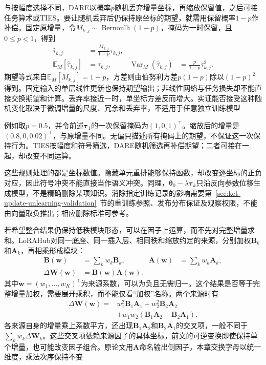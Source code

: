 与按幅度选择不同，DARE以概率$p$随机丢弃增量坐标，再缩放保留值，之后可接任务算术或TIES。要让随机丢弃后仍保持原坐标的期望，就需用保留概率$1-p$作补偿。固定原增量，令$M_{k,j}\sim\operatorname{Bernoulli}(1-p)$，掩码为一时保留，且$0\leq p<1$，得到
\begin{equation}
  \begin{aligned}
    \widehat{\tau}_{k,j}&=\frac{M_{k,j}}{1-p}\tau_{k,j},\\
    \mathbb{E}_M[\widehat{\tau}_{k,j}]&=\tau_{k,j},&
    \operatorname{Var}_M(\widehat{\tau}_{k,j})
      &=\frac{p}{1-p}\tau_{k,j}^{2}.
  \end{aligned}
  \label{eq:ket-integration-dare}
\end{equation}
期望等式来自$\mathbb{E}_M[M_{k,j}]=1-p$，方差则由伯努利方差$p(1-p)$除以$(1-p)^2$得到。固定输入的单层线性更新也保持期望输出；非线性网络与任务损失却不能直接交换期望和计算。丢弃率接近一时，单坐标方差反而增大。实证能否接受这种随机变化取决于微调增量的尺度、冗余和丢弃率，不适用于任意独立训练模型

例如取$p=0.5$，并令前述$\bm{\tau}_1$的一次保留掩码为$(1,0,1)^\top$。缩放后的增量是$(0.8,0,0.02)^\top$，与原增量不同。无偏只描述所有掩码上的期望，不保证这一次保持行为。TIES按幅度和符号筛选，DARE随机筛选再补偿期望；二者可接在一起，却改变不同运算。

这些规则处理的都是坐标数值。隐藏单元重排能够保持函数，却改变逐坐标的正负对应，因此符号冲突不能直接当作语义冲突。同理，$\bm{\theta}_0-\lambda\bm{\tau}_k$只沿反向参数位移生成模型，不是精确删除某项知识。消除指定训练记录的影响需要第~\ref{sec:ket-update-unlearning-validation}~节的重训练参照、发布分布保证及观察权限，不能由向量取负推出；相应删除标准可参考。

若希望整合结果仍保持低秩模块形态，可以在因子上运算，而不先对完整增量求和。LoRAHub对同一底座、同一插入层、相同秩和缩放约定的来源，分别加权$\bm{B}_k$和$\bm{A}_k$，再相乘形成模块：
\begin{equation}
  \begin{aligned}
    \bm{B}(\bm{w})&=\sum_k w_k\bm{B}_k,&
    \bm{A}(\bm{w})&=\sum_k w_k\bm{A}_k,\\
    \Delta\bm{W}(\bm{w})&=\bm{B}(\bm{w})\bm{A}(\bm{w}).
  \end{aligned}
  \label{eq:ket-integration-lorahub}
\end{equation}
其中$\bm{w}=(w_1,\ldots,w_K)^\top$为来源系数，可以为负且无需归一。这个结果是否等于完整增量加权，需要展开乘积，而不能仅看“加权”名称。两个来源时有
\begin{equation}
  \begin{aligned}
    \Delta\bm{W}(\bm{w})
      ={}&w_1^2\bm{B}_1\bm{A}_1+w_2^2\bm{B}_2\bm{A}_2\\
       &+w_1w_2(\bm{B}_1\bm{A}_2+\bm{B}_2\bm{A}_1).
  \end{aligned}
  \label{eq:ket-integration-lorahub-cross-terms}
\end{equation}
各来源自身的增量乘上系数平方，还出现$\bm{B}_1\bm{A}_2$和$\bm{B}_2\bm{A}_1$的交叉项，一般不同于$\sum_k w_k\Delta\bm{W}_k$。这些交叉项依赖来源因子的具体坐标，前文的可逆变换即使保持单个增量，也可能改变因子组合。原论文用$\bm{A}$命名输出侧因子，本章交换字母以统一维度，乘法次序保持不变

